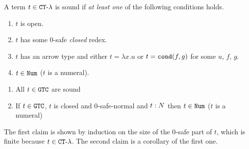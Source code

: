 \begin{definition}
A term $t \in { {\tt CT}\mbox{-}\lambda}$ is sound if \emph{at least one} of the following conditions holds.
\begin{enumerate}
\item
$t$ is open. 
\item
$t$ has some $0$-safe \emph{closed} redex. 
\item
$t$ has an arrow type and either $t=\lambda x.u$ or 
$t = {\tt cond}(f,g)$ for some $u$, $f$, $g$. %
\item
$t \in {\tt Num}$ ($t$ is a numeral). 
\end{enumerate}
\end{definition}

\begin{proposition}
\label{proposition-closed-safe-normal-term-N}
\begin{enumerate}
\item
All $t \in {\tt GTC}$ are sound
\item
If $t \in {\tt GTC}$, $t$ is closed and $0$-safe-normal and $t:{N}$ then $t \in {\tt Num}$ ($t$ is a numeral)
\end{enumerate}
\end{proposition}

The first claim is shown by induction on the size of the $0$-safe part of $t$, 
which is finite because $t \in { {\tt CT}\mbox{-}\lambda}$. The second claim is a corollary of the first one.

